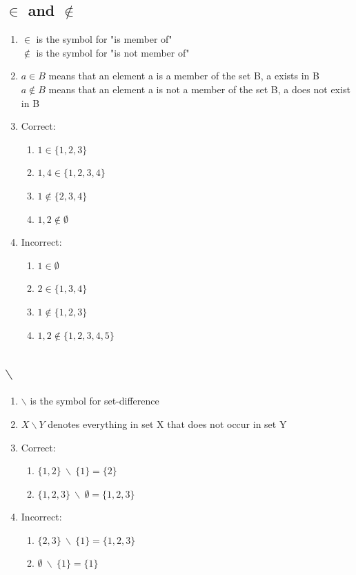 \documentclass{article}
\begin{document}
\subsection{$\in$ and $\notin$}
\begin{enumerate}
    \item $\in$ is the symbol for "is member of" \\ $\notin$ is the symbol for "is not member of"
    \item $ a \in B$ means that an element a is a member of the set B, a exists in B \\ $a \notin B$ means that an element a is not a member of the set B, a does not exist in B
    \item Correct:
    \begin{enumerate}
        \item $1 \in \{1, 2, 3\}$
        \item $1, 4 \in \{1,2,3,4\}$
        \item $1 \notin \{2,3,4\}$
        \item $1,2 \notin \emptyset$
    \end{enumerate}
    \item Incorrect:
    \begin{enumerate}
        \item $1 \in \emptyset$
        \item $2 \in \{1,3,4\}$
        \item $1 \notin \{1,2,3\}$
        \item $1,2 \notin \{1,2,3,4,5\}$
    \end{enumerate}
\end{enumerate}

\subsection{$\backslash$}
\begin{enumerate}
    \item $\backslash$ is the symbol for set-difference
    \item $X \backslash Y$ denotes everything in set X that does not occur in set Y
    \item Correct:
    \begin{enumerate}
        \item $\{1, 2\} \  \backslash \  \{1\} = \{2\}$
        \item $\{1, 2, 3\} \  \backslash \  \emptyset = \{1, 2, 3\}$
    \end{enumerate}
    \item Incorrect:
    \begin{enumerate}
        \item $\{2, 3\} \  \backslash \  \{1\} = \{1, 2, 3\}$
        \item $\emptyset \  \backslash \  \{1\} = \{1\}$
    \end{enumerate}
\end{enumerate}
\end{document}
